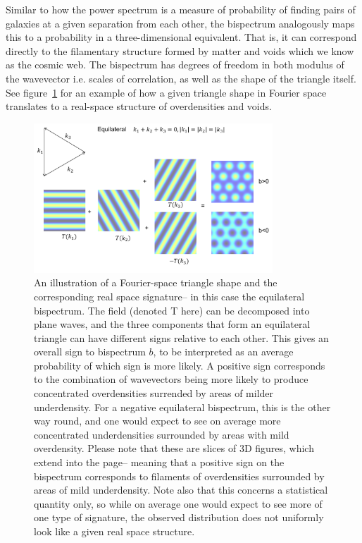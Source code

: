 Similar to how the power spectrum is a measure of probability of finding pairs of galaxies at a given separation from each other, the bispectrum analogously maps this to a probability in a three-dimensional equivalent. That is, it can correspond directly to the filamentary structure formed by matter and voids which we know as the cosmic web. The bispectrum has degrees of freedom in both modulus of the wavevector i.e. scales of correlation, as well as the shape of the triangle itself. See figure~\ref{fig:realspacesignature} for an example of how a given triangle shape in Fourier space translates to a real-space structure of overdensities and voids. 

\begin{figure}[ht!]
	\centering
	\includegraphics[width=0.8\textwidth]{fig/Equilateral.png}
	\caption{An illustration of a Fourier-space triangle shape and the corresponding real space signature-- in this case the equilateral bispectrum. The field (denoted T here) can be decomposed into plane waves, and the three components that form an equilateral triangle can have different signs relative to each other. This gives an overall sign to bispectrum $b$, to be interpreted as an average probability of which sign is more likely. A positive sign corresponds to the combination of wavevectors being more likely to produce concentrated overdensities surrended by areas of milder underdensity. For a negative equilateral bispectrum, this is the other way round, and one would expect to see on average more concentrated underdensities surrounded by areas with mild overdensity. Please note that these are slices of 3D figures, which extend into the page-- meaning that a positive sign on the bispectrum corresponds to filaments of overdensities surrounded by areas of mild underdensity. Note also that this concerns a statistical quantity only, so while on average one would expect to see more of one type of signature, the observed distribution does not uniformly look like a given real space structure.~\cite{Lewis:2011}}
	\label{fig:realspacesignature}
\end{figure}

